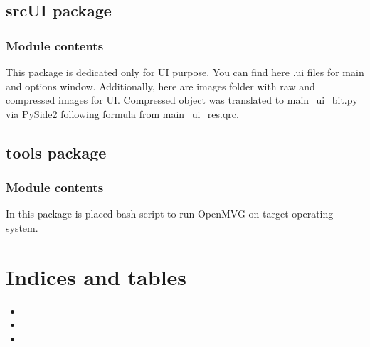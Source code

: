 \documentclass[letterpaper,10pt,english]{sphinxmanual}
\begin{document}
\sphinxstepscope


\section{srcUI package}
\label{\detokenize{srcUI:srcui-package}}\label{\detokenize{srcUI::doc}}

\subsection{Module contents}
\label{\detokenize{srcUI:module-srcUI}}\label{\detokenize{srcUI:module-contents}}
\sphinxAtStartPar
This package is dedicated only for UI purpose. You can find here .ui files for main and options window.
Additionally, here are images folder with raw and compressed images for UI.
Compressed object was translated to main\_ui\_bit.py via PySide2 following formula from main\_ui\_res.qrc.

\sphinxstepscope


\section{tools package}
\label{\detokenize{tools:tools-package}}\label{\detokenize{tools::doc}}

\subsection{Module contents}
\label{\detokenize{tools:module-tools}}\label{\detokenize{tools:module-contents}}
\sphinxAtStartPar
In this package is placed bash script to run OpenMVG on target operating system.


\chapter{Indices and tables}
\label{\detokenize{index:indices-and-tables}}\begin{itemize}
\item {} 
\sphinxAtStartPar
{}

\item {} 
\sphinxAtStartPar
{}

\item {} 
\sphinxAtStartPar
{}

\end{itemize}
\end{document}
